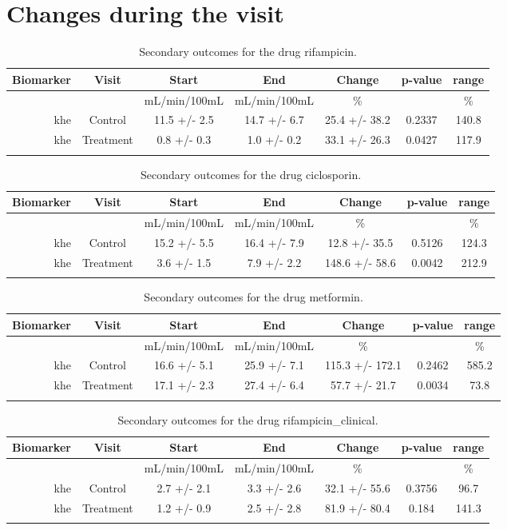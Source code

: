 \documentclass{epflreport}%
\begin{document}
\section{Changes during the visit}%
\label{sec:Changesduringthevisit}%

%
\begin{longtable}{rcccccc}%
\hline%
Biomarker&Visit&Start&End&Change&p{-}value&range\\%
\hline%
&&mL/min/100mL&mL/min/100mL&\%&&\%\\%
khe&Control&11.5 +/{-} 2.5&14.7 +/{-} 6.7&25.4 +/{-} 38.2&0.2337&140.8\\%
khe&Treatment&0.8 +/{-} 0.3&1.0 +/{-} 0.2&33.1 +/{-} 26.3&0.0427&117.9\\%
\hline%
\caption{Secondary outcomes for the drug rifampicin.} \\%
\end{longtable}%
\begin{longtable}{rcccccc}%
\hline%
Biomarker&Visit&Start&End&Change&p{-}value&range\\%
\hline%
&&mL/min/100mL&mL/min/100mL&\%&&\%\\%
khe&Control&15.2 +/{-} 5.5&16.4 +/{-} 7.9&12.8 +/{-} 35.5&0.5126&124.3\\%
khe&Treatment&3.6 +/{-} 1.5&7.9 +/{-} 2.2&148.6 +/{-} 58.6&0.0042&212.9\\%
\hline%
\caption{Secondary outcomes for the drug ciclosporin.} \\%
\end{longtable}%
\begin{longtable}{rcccccc}%
\hline%
Biomarker&Visit&Start&End&Change&p{-}value&range\\%
\hline%
&&mL/min/100mL&mL/min/100mL&\%&&\%\\%
khe&Control&16.6 +/{-} 5.1&25.9 +/{-} 7.1&115.3 +/{-} 172.1&0.2462&585.2\\%
khe&Treatment&17.1 +/{-} 2.3&27.4 +/{-} 6.4&57.7 +/{-} 21.7&0.0034&73.8\\%
\hline%
\caption{Secondary outcomes for the drug metformin.} \\%
\end{longtable}%
\begin{longtable}{rcccccc}%
\hline%
Biomarker&Visit&Start&End&Change&p{-}value&range\\%
\hline%
&&mL/min/100mL&mL/min/100mL&\%&&\%\\%
khe&Control&2.7 +/{-} 2.1&3.3 +/{-} 2.6&32.1 +/{-} 55.6&0.3756&96.7\\%
khe&Treatment&1.2 +/{-} 0.9&2.5 +/{-} 2.8&81.9 +/{-} 80.4&0.184&141.3\\%
\hline%
\caption{Secondary outcomes for the drug rifampicin\_clinical.} \\%
\end{longtable}%
\clearpage%
\end{document}
